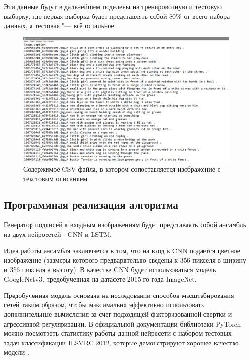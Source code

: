 \documentclass[bachelor, och, coursework]{SCWorks}
\begin{document}
        Эти данные будут в дальнейшем поделены на тренировочную и тестовую
        выборку, где первая выборка будет представлять собой 80\% от всего
        набора данных, а тестовая "--- всё остальное.

        \begin{figure}[H]
            \centering
            \includegraphics[width=1\textwidth]{pics/dataset.png}
            \caption{Содержимое CSV файла, в котором сопоставляется изображение
                     с текстовым описанием}
        \end{figure}


    \subsection{Программная реализация алгоритма}

        Генератор подписей к входным изображениям будет представлять собой
        ансамбль из двух нейросетей - CNN и LSTM.

        Идея работы ансамбля заключается в том, что на вход к CNN подается
        цветное изображение (размеры которого предварительно сведены к 356
        пикселя в ширину и 356 пикселя в высоту). В качестве CNN будет
        использоваться модель GoogleNetv3, предобученная на датасете 2015-го
        года ImageNet.
        
        Предобученная модель основана на исследовании способов масштабирования
        сетей таким образом, чтобы максимально эффективно использовать
        дополнительные вычисления за счет подходящей факторизованной свертки и
        агрессивной регуляризации. В официальной документации библиотеки PyTorch
        можно посмотреть статистику работы данной нейросети с набором тестовых
        задач классификации ILSVRC 2012, которые демонстрируют хорошее качество
        модели \cite{inception}.
        
\end{document}
